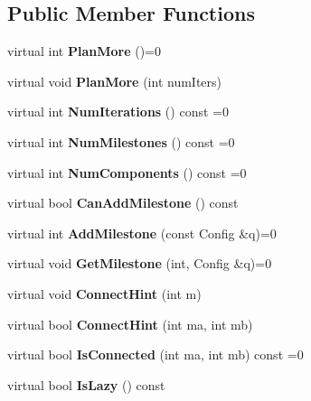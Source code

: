 \subsection*{Public Member Functions}
\begin{DoxyCompactItemize}
\item 
virtual int {\bfseries Plan\+More} ()=0\label{classMotionPlannerInterface_a81be8094ff8ecc8f070178b0ab13943a}

\item 
virtual void {\bfseries Plan\+More} (int num\+Iters)\label{classMotionPlannerInterface_ab15dedf8e15dd82eed4c185067f3d453}

\item 
virtual int {\bfseries Num\+Iterations} () const =0\label{classMotionPlannerInterface_a299bde5aa905aeea95aa34f6210571ae}

\item 
virtual int {\bfseries Num\+Milestones} () const =0\label{classMotionPlannerInterface_a6836d6cb657f841131727780fc0a96b8}

\item 
virtual int {\bfseries Num\+Components} () const =0\label{classMotionPlannerInterface_afb78c259e3402dfb61db41f519f2c7db}

\item 
virtual bool {\bfseries Can\+Add\+Milestone} () const \label{classMotionPlannerInterface_afd0a92e08a1c3832e0d9cf2757d097f2}

\item 
virtual int {\bfseries Add\+Milestone} (const Config \&q)=0\label{classMotionPlannerInterface_a9507063decfc0ea0b89a8f42f562cf0f}

\item 
virtual void {\bfseries Get\+Milestone} (int, Config \&q)=0\label{classMotionPlannerInterface_a4e397f7d21cd7435e1feefa4934c05e4}

\item 
virtual void {\bfseries Connect\+Hint} (int m)\label{classMotionPlannerInterface_a18aea6c99e377f4e7e0dc408e3a6f6d7}

\item 
virtual bool {\bfseries Connect\+Hint} (int ma, int mb)\label{classMotionPlannerInterface_a74fc89bf89add178023d5356bcc68a7f}

\item 
virtual bool {\bfseries Is\+Connected} (int ma, int mb) const =0\label{classMotionPlannerInterface_ab868c9e00e603327d4d64ea52ab66162}

\item 
virtual bool {\bfseries Is\+Lazy} () const \label{classMotionPlannerInterface_ab9642dbf258c803357705592a74e1682}


\end{DoxyCompactItemize}
